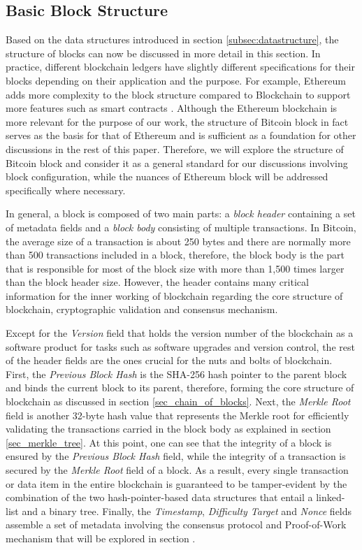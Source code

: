 \subsection{Basic Block Structure}

Based on the data structures introduced in section \ref{subsec:datastructure}, the structure of blocks can now be discussed in more detail in this section. In practice, different blockchain ledgers have slightly different specifications for their blocks depending on their application and the purpose. For example, Ethereum adds more complexity to the block structure compared to Blockchain to support more features such as smart contracts \cite{wood2014ethereum}. Although the Ethereum blockchain is more relevant for the purpose of our work, the structure of Bitcoin block in fact serves as the basis for that of Ethereum and is sufficient as a foundation for other discussions in the rest of this paper. Therefore, we will explore the structure of Bitcoin block and consider it as a general standard for our discussions involving block configuration, while the nuances of Ethereum block will be addressed specifically where necessary.


In general, a block is composed of two main parts: a \textit{block header} containing a set of metadata fields and a \textit{block body} consisting of multiple transactions. In Bitcoin, the average size of a transaction is about 250 bytes and there are normally more than 500 transactions included in a block, therefore, the block body is the part that is responsible for most of the block size with more than 1,500 times larger than the block header size. However, the header contains many critical information for the inner working of blockchain regarding the core structure of blockchain, cryptographic validation and consensus mechanism.

Except for the \textit{Version} field that holds the version number of the blockchain as a software product for tasks such as software upgrades and version control, the rest of the header fields are the ones crucial for the nuts and bolts of blockchain. First, the \textit{Previous Block Hash} is the SHA-256 hash pointer to the parent block and binds the current block to its parent, therefore, forming the core structure of blockchain as discussed in section \ref{sec_chain_of_blocks}. Next, the \textit{Merkle Root} field is another 32-byte hash value that represents the Merkle root for efficiently validating the transactions carried in the block body as explained in section \ref{sec_merkle_tree}. At this point, one can see that the integrity of a block is ensured by the \textit{Previous Block Hash} field, while the integrity of a transaction is secured by the \textit{Merkle Root} field of a block. As a result, every single transaction or data item in the entire blockchain is guaranteed to be tamper-evident by the combination of the two hash-pointer-based data structures that entail a linked-list and a binary tree. 
Finally, the \textit{Timestamp}, \textit{Difficulty Target} and \textit{Nonce} fields assemble a set of metadata involving the consensus protocol and Proof-of-Work mechanism that will be explored in section \label{subsubsec:pow}. 


